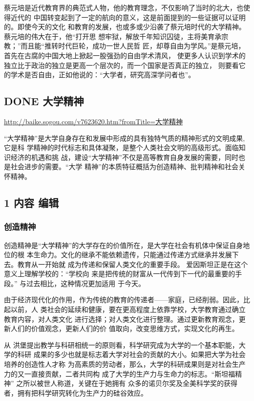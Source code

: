 \documentclass[11pt]{ctexart}
\begin{document}
{{{{蔡元培是近代教育界的典范式人物，他的教育理念，不仅影响了当时的北大，也使得近代的
中国转变起到了一定的航向的意义，这是前面提到的一些证据可以证明的。即使今天的文化
和教育的发展，也或多或少沿袭了蔡元培时代的大学精神。蔡元培的伟大在于，他“打开思
想牢狱，解放千年知识囚徒，主将美育承宗教；”而且能“推转时代巨轮，成功一世人民哲
匠，却尊自由为学风。”是蔡元培，首先在古腐的中国大地上掀起一股强劲的自由学术清风，
使更多人认识到学术的独立比于政治的独立是更高一个层次的，而一个国家是否真正的独立，
则要看它的学术是否自由，正如他说的：“大学者，研究高深学问者也”。

\subsection{{\bfseries\sffamily DONE} 大学精神}
\label{sec:orgaab9c06}
\url{http://baike.sogou.com/v7623620.htm?fromTitle=大学精神}

“大学精神”是大学自身存在和发展中形成的具有独特气质的精神形式的文明成果,它是科
学精神的时代标志和具体凝聚，是整个人类社会文明的高级形式。面临知识经济的机遇和挑
战，建设“大学精神”不仅是高等教育自身发展的需要，同时也是社会进步的需要。“大学
精神”的本质特征概括为创造精神、批判精神和社会关怀精神。

\subsection{1 内容 编辑}
\label{sec:orgf2f2187}
\subsubsection{创造精神}
\label{sec:orgdcd2d90}

创造精神是“大学精神”的大学存在的价值所在，是大学在社会有机体中保证自身地位的根
本生命力。文化的继承不能依赖遗传，只能通过传递方式继承并发展下去。教育从一开始就
成为传递和保留人类文化的重要手段。 爱因斯坦正是在这个意义上理解学校的：“学校向
来是把传统的财富从一代传到下一代的最重要的手段。” 与过去相比，这种情况更加适用
于今天。


由于经济现代化的作用，作为传统的教育的传递者——家庭，已经削弱。因此，比起以前，人
类社会的延续和健康，要在更高程度上依靠学校，大学教育通过确立教育内容，对人类文化
进行选择；对人类文化进行整理。通过更新教育观念，更新人们的价值观念，更新人们的价
值取向，改变思维方式，实现文化的再生。


从 洪堡提出教学与科研相统一的原则看，科学研究成为大学的一个基本职能，大学的科研
成果的多少也就是标志着大学对社会的贡献的大小。如果把大学为社会培养的创造性人才称
为高素质的劳动者，那么，大学的科研成果则是对社会生产力的又一直接贡献，二者共同构
成了大学的生产力与生命力的标志。“斯坦福精神” 之所以被世人称道，关键在于她拥有
众多的诺贝尔奖及全美科学奖的获得者，拥有把科学研究转化为生产力的硅谷效应。


}}}}
\end{document}
